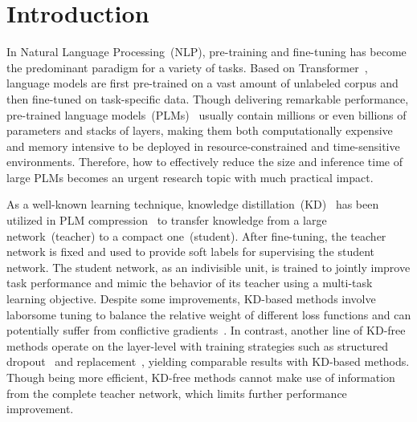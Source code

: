 \section{Introduction}
In Natural Language Processing~(NLP), pre-training and fine-tuning has become the predominant paradigm for a variety of tasks. 
Based on Transformer~\cite{transformer}, language models are first pre-trained on a vast amount of unlabeled corpus and then fine-tuned on task-specific data. Though delivering remarkable 
performance, pre-trained language models~(PLMs)~\cite{bert,roberta} usually contain millions or even billions of parameters and stacks of layers, making them both computationally expensive and memory intensive to be deployed in 
resource-constrained and time-sensitive environments. Therefore, how to effectively reduce the size and inference time of large PLMs becomes an urgent research topic with much practical impact.

As a well-known learning technique, knowledge distillation~(KD)~\cite{kd} has been utilized in PLM compression~\cite{pkd,ckd,alpkd} to transfer knowledge from a large network~(teacher) to a
compact one~(student). After fine-tuning, the teacher network is fixed and used to provide soft labels for supervising the student network. The student network, as an indivisible unit, is trained to jointly improve task performance and mimic the behavior of its teacher using a multi-task learning objective. Despite some improvements, KD-based methods involve laborsome tuning to balance
the relative weight of different loss functions and can potentially suffer from conflictive gradients~\cite{gaml}. In contrast, another line of KD-free methods operate on the layer-level with training strategies such as structured dropout~\cite{layerdrop} and replacement~\cite{theseus}, yielding comparable results with KD-based methods. Though being more
efficient, KD-free methods cannot make use of information from the complete teacher network, which limits further performance improvement.

